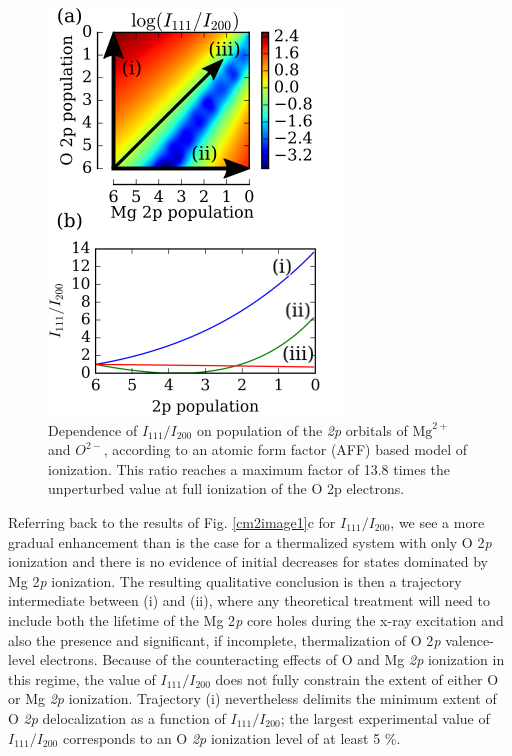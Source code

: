 \begin{figure}[h] \label{cm2image2}
\caption{
Dependence of
\(I_{111}/I_{200}\)
on population of the \emph{2p} orbitals of
\(\text{Mg}^{2 +}\)
and \(O^{2 -}\), according to an atomic form factor (AFF) based model of
ionization. This ratio reaches a maximum factor of 13.8 times the
unperturbed value at full ionization of the O 2p electrons.
}
\centering
\includegraphics{MgO_2.7.docx1503027860/media/image2.png}
\end{figure}

Referring back to the results of Fig. \ref{cm2image1}c
for \(I_{111}/I_{200}\), we see a more gradual enhancement than is the case
for a thermalized system with only O 2\emph{p} ionization and there is
no evidence of initial decreases for states dominated by Mg 2\emph{p}
ionization. The resulting qualitative conclusion is then a trajectory
intermediate between (i) and (ii), where any theoretical treatment will
need to include both the lifetime of the Mg 2\emph{p} core holes during
the x-ray excitation and also the presence and significant, if
incomplete, thermalization of O 2\emph{p} valence-level electrons.
Because of the counteracting effects of O and Mg \emph{2p} ionization in
this regime, the value of \(I_{111}/I_{200}\) does not fully constrain
the extent of either O or Mg \emph{2p} ionization. Trajectory (i)
nevertheless delimits the minimum extent of O \emph{2p} delocalization
as a function of \(I_{111}/I_{200}\); the largest experimental value of
\(I_{111}/I_{200}\) corresponds to an O \emph{2p} ionization level of at
least 5 \%.


